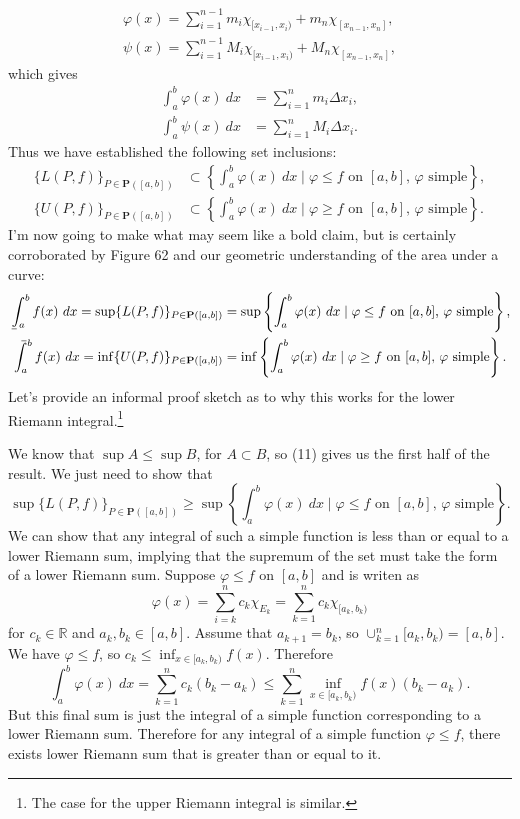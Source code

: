 \documentclass{article}
\def\upint{\mathchoice%
	{\mkern13mu\overline{\vphantom{\intop}\mkern7mu}\mkern-20mu}%
	{\mkern7mu\overline{\vphantom{\intop}\mkern7mu}\mkern-14mu}%
	{\mkern7mu\overline{\vphantom{\intop}\mkern7mu}\mkern-14mu}%
	{\mkern7mu\overline{\vphantom{\intop}\mkern7mu}\mkern-14mu}%
	\int}
\def\lowint{\mkern3mu\underline{\vphantom{\intop}\mkern7mu}\mkern-10mu\int}
\newcommand{\R}{\mathbb{R}}
\theoremstyle{definition}
\begin{document}
\begin{align*}
	\varphi(x)=\sum_{i=1}^{n-1}m_i\chi_{[x_{i-1},x_i)}+m_n\chi_{[x_{n-1},x_n]},\\\psi(x)=\sum_{i=1}^{n-1}M_i\chi_{[x_{i-1},x_i)}+M_n\chi_{[x_{n-1},x_n]},
\end{align*} 
which gives
\begin{align*}
\int_{a}^{b}\varphi(x)\ dx&=\sum_{i=1}^nm_i\Delta x_i,\\
\int_{a}^{b}\psi(x)\ dx&=\sum_{i=1}^nM_i\Delta x_i.	
\end{align*}
Thus we have established the following set inclusions:
\begin{align}
	\{L(P,f)\}_{P\in\textbf{P}([a,b])}&\subset \left\{\int_a^b\varphi(x)\ dx\mid \varphi\le f\text{ on }[a,b]\text{, } \varphi\text{ simple}\right\},\\
	\{U(P,f)\}_{P\in\textbf{P}([a,b])}&\subset \left\{\int_a^b\varphi(x)\ dx\mid \varphi\ge f\text{ on }[a,b]\text{, } \varphi\text{ simple}\right\}.
\end{align} 
I'm now going to make what may seem like a bold claim, but is certainly corroborated by Figure 62 and our geometric understanding of the area under a curve:
\begin{align*}
\lowint_a^b f(x)\ dx=\sup\{L(P,f)\}_{P\in\textbf{P}([a,b])}&=\sup \left\{\int_a^b\varphi(x)\ dx\mid \varphi\le f\text{ on }[a,b]\text{, } \varphi\text{ simple}\right\},\\
\upint_a^b f(x)\ dx=\inf\{U(P,f)\}_{P\in\textbf{P}([a,b])}&=\inf\left\{\int_a^b\varphi(x)\ dx\mid \varphi\ge f\text{ on }[a,b]\text{, } \varphi\text{ simple}\right\}.
\end{align*} 
Let's provide an informal proof sketch as to why this works for the lower Riemann integral.\footnote{The case for the upper Riemann integral is similar.}

We know that $ \sup A\le \sup B $, for $ A\subset B $, so (11) gives us the first half of the result. We just need to show that
$$\sup\{L(P,f)\}_{P\in\textbf{P}([a,b])}\ge\sup \left\{\int_a^b\varphi(x)\ dx\mid \varphi\le f\text{ on }[a,b]\text{, } \varphi\text{ simple}\right\} .$$ We can show that any integral of such a simple function is less than or equal to a lower Riemann sum, implying that the supremum of the set must take the form of a lower Riemann sum. Suppose $ \varphi\le f$ on $ [a,b]  $ and is writen as $$\varphi(x)=\sum_{i=k}^{n}c_k\chi_{E_k}=\sum_{k=1}^{n}c_k\chi_{[a_k,b_k)} $$ for $ c_k\in\R $ and $ a_k,b_k\in [a,b] $. Assume that $ a_{k+1}=b_{k} $, so $ \cup_{k=1}^n[a_k,b_k)=[a,b] $. We have $ \varphi\le f $, so $ c_k\le\inf_{x\in[a_k,b_k)}f(x) $. Therefore 
$$\int_{a}^{b}\varphi(x)\ dx=\sum_{k=1}^{n}c_k(b_k-a_k)\le \sum_{k=1}^{n} \inf\limits_{x\in[a_k,b_k)}f(x)(b_k-a_k) .$$ But this final sum is just the integral of a simple function corresponding to a lower Riemann sum. Therefore for any integral of a simple function $ \varphi\le f $, there exists lower Riemann sum that is greater than or equal to it. 
\end{document}
